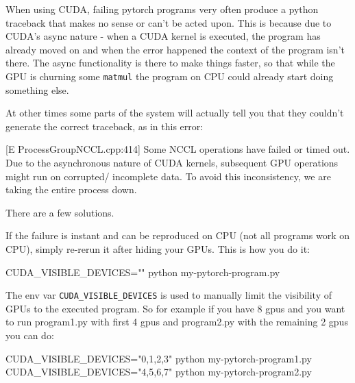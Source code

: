 \documentclass[
]{report}
\newenvironment{Shaded}{\begin{snugshade}}{\end{snugshade}}
\newcommand{\ExtensionTok}[1]{\textcolor[rgb]{0.00,0.23,0.31}{#1}}
\newcommand{\NormalTok}[1]{\textcolor[rgb]{0.00,0.23,0.31}{#1}}
\newcommand{\OperatorTok}[1]{\textcolor[rgb]{0.37,0.37,0.37}{#1}}
\newcommand{\StringTok}[1]{\textcolor[rgb]{0.13,0.47,0.30}{#1}}
\newcommand{\VariableTok}[1]{\textcolor[rgb]{0.07,0.07,0.07}{#1}}
\begin{document}
When using CUDA, failing pytorch programs very often produce a python
traceback that makes no sense or can't be acted upon. This is because
due to CUDA's async nature - when a CUDA kernel is executed, the program
has already moved on and when the error happened the context of the
program isn't there. The async functionality is there to make things
faster, so that while the GPU is churning some \texttt{matmul} the
program on CPU could already start doing something else.

At other times some parts of the system will actually tell you that they
couldn't generate the correct traceback, as in this error:

\begin{Shaded}
\begin{Highlighting}[]
\ExtensionTok{[E}\NormalTok{ ProcessGroupNCCL.cpp:414] Some NCCL operations have failed or timed out. Due to the}
\ExtensionTok{asynchronous}\NormalTok{ nature of CUDA kernels, subsequent GPU operations might run on corrupted/}
\ExtensionTok{incomplete}\NormalTok{ data. To avoid this inconsistency, we are taking the entire process down.}
\end{Highlighting}
\end{Shaded}

There are a few solutions.

If the failure is instant and can be reproduced on CPU (not all programs
work on CPU), simply re-rerun it after hiding your GPUs. This is how you
do it:

\begin{Shaded}
\begin{Highlighting}[]
\VariableTok{CUDA\_VISIBLE\_DEVICES}\OperatorTok{=}\StringTok{""} \ExtensionTok{python}\NormalTok{ my{-}pytorch{-}program.py}
\end{Highlighting}
\end{Shaded}

The env var \texttt{CUDA\_VISIBLE\_DEVICES} is used to manually limit
the visibility of GPUs to the executed program. So for example if you
have 8 gpus and you want to run program1.py with first 4 gpus and
program2.py with the remaining 2 gpus you can do:

\begin{Shaded}
\begin{Highlighting}[]
\VariableTok{CUDA\_VISIBLE\_DEVICES}\OperatorTok{=}\StringTok{"0,1,2,3"} \ExtensionTok{python}\NormalTok{ my{-}pytorch{-}program1.py}
\VariableTok{CUDA\_VISIBLE\_DEVICES}\OperatorTok{=}\StringTok{"4,5,6,7"} \ExtensionTok{python}\NormalTok{ my{-}pytorch{-}program2.py}
\end{Highlighting}
\end{Shaded}
\end{document}
